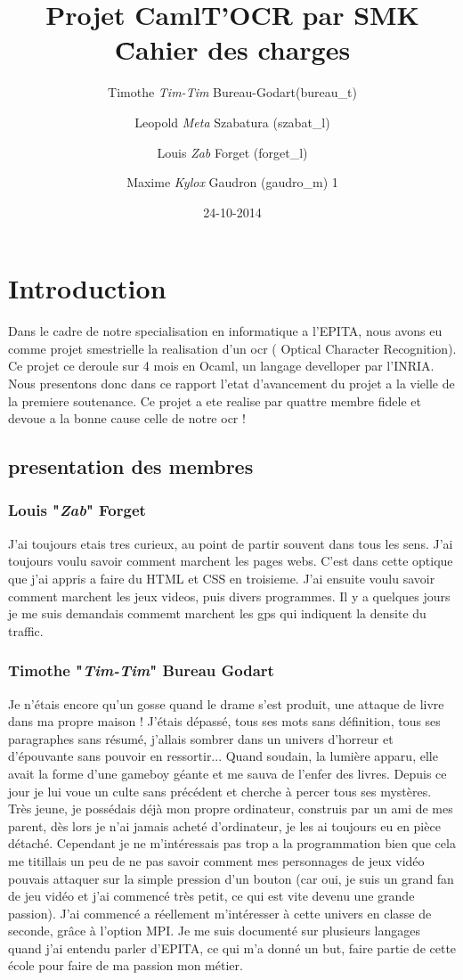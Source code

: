 \documentclass{article}
\title{Projet CamlT'OCR par SMK \~Cahier des charges}
\date{24-10-2014}
\author{
    Timothe \textit{Tim-Tim} Bureau-Godart(bureau\_t) \and
        Leopold \textit{Meta} Szabatura (szabat\_l) \and
        Louis \textit{Zab} Forget (forget\_l) \and
        Maxime \textit{Kylox} Gaudron (gaudro\_m)
        1      }
\begin{document}
\begin{center}
\maketitle
\end{center}
\newpage
\tableofcontents
\newpage
\section{Introduction}
Dans le cadre de notre specialisation en informatique a l'EPITA, nous avons eu comme projet smestrielle la realisation d'un ocr ( Optical Character Recognition). Ce projet ce deroule sur 4 mois en Ocaml, un langage develloper par l'INRIA. Nous presentons donc dans ce rapport l'etat d'avancement du projet a la vielle de la premiere soutenance. Ce projet a ete realise par quattre membre fidele et devoue a la bonne cause celle de notre ocr ! 
\subsection{presentation des membres}
\subsubsection{Louis "\textit{Zab}" Forget}
J'ai toujours etais tres curieux, au point de partir souvent dans tous les sens. J'ai toujours voulu savoir comment marchent les pages webs. C'est dans cette optique que j'ai appris a faire du HTML et CSS en troisieme. J'ai ensuite voulu savoir comment marchent les jeux videos, puis divers programmes. Il y a quelques jours je me suis demandais commemt marchent les gps qui indiquent la densite du traffic.
\subsubsection{Timothe "\textit{Tim-Tim}" Bureau Godart}
Je n'étais encore qu'un gosse quand le drame s'est produit, une attaque de livre dans ma propre maison ! J'étais dépassé, tous ses mots sans définition, tous ses paragraphes sans résumé, j'allais sombrer dans un univers d'horreur et d'épouvante sans pouvoir en ressortir... Quand soudain, la lumière apparu, elle avait la forme d'une gameboy géante et me sauva de l'enfer des livres. Depuis ce jour je lui voue un culte sans précédent et cherche à percer tous ses mystères.
Très jeune, je possédais déjà mon propre ordinateur, construis par un ami de mes parent, dès lors je n'ai jamais acheté d'ordinateur, je les ai toujours eu en pièce détaché. Cependant je ne m'intéressais pas trop a la programmation bien que cela me titillais un peu de ne pas savoir comment mes personnages de jeux vidéo pouvais attaquer sur la simple pression d'un bouton (car oui, je suis un grand fan de jeu vidéo et j'ai commencé très petit, ce qui est vite devenu une grande passion). J'ai commencé a réellement m'intéresser à cette univers en classe de seconde, grâce à l'option MPI. Je me suis documenté sur plusieurs langages quand j'ai entendu parler d'EPITA, ce qui m'a donné un but, faire partie de cette école pour faire de ma passion mon métier.
\end{document}
